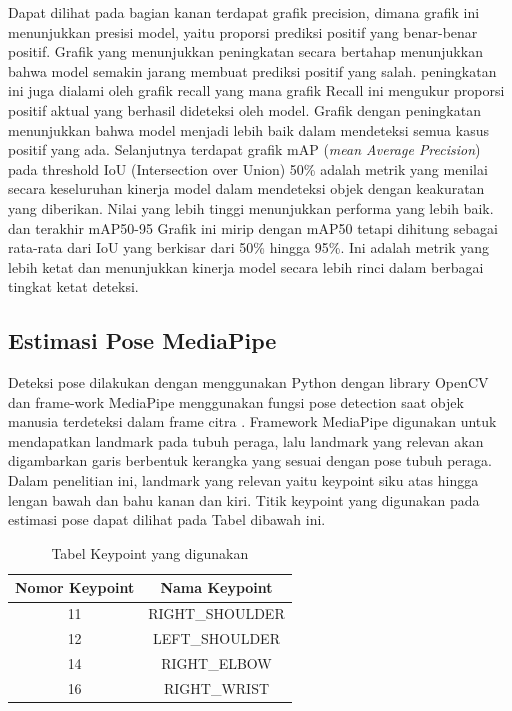 Dapat dilihat pada bagian kanan terdapat grafik precision, dimana grafik ini menunjukkan presisi model, yaitu proporsi prediksi positif yang benar-benar positif. Grafik yang menunjukkan peningkatan secara bertahap menunjukkan bahwa model semakin jarang membuat prediksi positif yang salah. peningkatan ini juga dialami oleh grafik recall yang mana grafik Recall ini mengukur proporsi positif aktual yang berhasil dideteksi oleh model. Grafik dengan peningkatan menunjukkan bahwa model menjadi lebih baik dalam mendeteksi semua kasus positif yang ada. Selanjutnya terdapat grafik mAP (\emph{mean Average Precision}) pada threshold IoU (Intersection over Union) 50\% adalah metrik yang menilai secara keseluruhan kinerja model dalam mendeteksi objek dengan keakuratan yang diberikan. Nilai yang lebih tinggi menunjukkan performa yang lebih baik. dan terakhir mAP50-95 Grafik ini mirip dengan mAP50 tetapi dihitung sebagai rata-rata dari IoU yang berkisar dari 50\% hingga 95\%. Ini adalah metrik yang lebih ketat dan menunjukkan kinerja model secara lebih rinci dalam berbagai tingkat ketat deteksi.

\subsection{Estimasi Pose MediaPipe}
Deteksi pose dilakukan dengan menggunakan Python dengan library OpenCV dan frame-work MediaPipe menggunakan fungsi pose detection saat objek manusia terdeteksi dalam frame citra . Framework MediaPipe digunakan untuk mendapatkan landmark pada tubuh peraga, lalu landmark yang relevan akan digambarkan garis berbentuk kerangka yang sesuai dengan pose tubuh peraga. Dalam penelitian ini, landmark yang relevan yaitu keypoint siku atas hingga lengan bawah dan bahu kanan dan kiri. Titik keypoint yang digunakan pada estimasi pose dapat dilihat pada Tabel dibawah ini.

\begin{longtable}{|c|c|}
  \caption{Tabel Keypoint yang digunakan}
  \label{tb:EnergiKecepatan}                                   \\
  \hline
  \rowcolor[HTML]{C0C0C0}
  \textbf{Nomor Keypoint} & \textbf{Nama Keypoint}  \\
  \hline
  11            & RIGHT\_SHOULDER        \\
  12            & LEFT\_SHOULDER         \\
  14            & RIGHT\_ELBOW           \\
  16            & RIGHT\_WRIST           \\
  \hline
\end{longtable}


